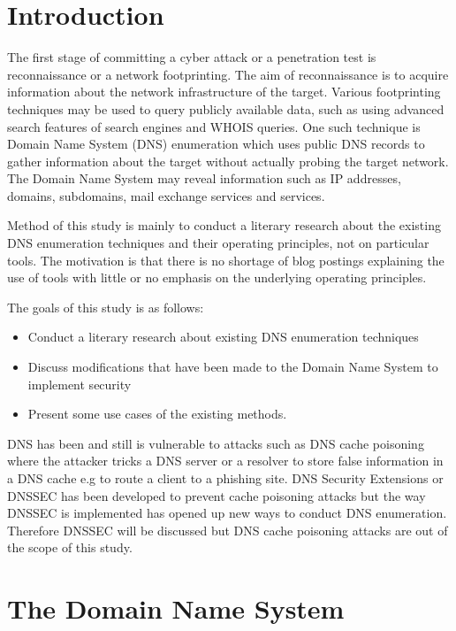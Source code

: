 
\section{Introduction}

The first stage of committing a cyber attack or a penetration test is reconnaissance or a network footprinting. The aim of reconnaissance is to acquire information about the network infrastructure of the target. Various footprinting techniques may be used to query publicly available data, such as using advanced search features of search engines and WHOIS queries. One such technique is Domain Name System (DNS) enumeration which uses public DNS records to gather information about the target without actually probing the target network. The Domain Name System may reveal information such as IP addresses, domains, subdomains, mail exchange services and services.

Method of this study is mainly to conduct a literary research about the existing DNS enumeration techniques and their operating principles, not on particular tools. The motivation is that there is no shortage of blog postings explaining the use of tools with little or no emphasis on the underlying operating principles.

The goals of this study is as follows:

\begin{itemize}
 \item Conduct a literary research about existing DNS enumeration techniques
 \item Discuss modifications that have been made to the Domain Name System to implement security
 \item Present some use cases of the existing methods.
\end{itemize}

DNS has been and still is vulnerable to attacks such as DNS cache poisoning where the attacker tricks a DNS server or a resolver to store false information in a DNS cache e.g to route a client to a phishing site. DNS Security Extensions or DNSSEC has been developed to prevent cache poisoning attacks but the way DNSSEC is implemented has opened up new ways to conduct DNS enumeration. Therefore DNSSEC will be discussed but DNS cache poisoning attacks are out of the scope of this study.


\section{The Domain Name System}

